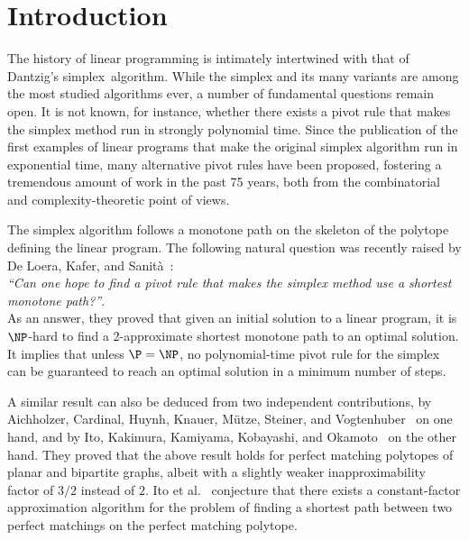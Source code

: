 \documentclass[runningheads]{llncs}
\begin{document}
\section{Introduction}
The history of linear programming is intimately intertwined with that of Dantzig's simplex~algorithm.
While the simplex and its many variants are among the most studied algorithms ever,
a number of fundamental questions remain open. It is not known, for instance, whether there exists
a pivot rule that makes the simplex method run in strongly polynomial time.
Since the publication of the first examples of linear programs that make the original simplex algorithm run in exponential time, many alternative pivot rules have been proposed, fostering a tremendous amount of work in the past 75 years, both from the combinatorial and complexity-theoretic point of views.

The simplex algorithm follows a monotone path on the skeleton of the polytope defining the linear program. The following natural question was recently raised by De Loera, Kafer, and Sanit\`a~\cite{DKS22}:\\

\noindent\textit{``Can one hope to find a pivot rule that makes the simplex method use a shortest monotone path?''}.\\

As an answer, they proved that given an initial solution to a linear program, it is $\NP$-hard to find a 2-approximate shortest monotone path to an optimal solution.
It implies that unless $\P =\NP$, no polynomial-time pivot rule for the simplex can be guaranteed to reach an optimal solution in a minimum number of steps.

A similar result can also be deduced from two independent contributions, by Aichholzer, Cardinal, Huynh, Knauer, M\"utze, Steiner, and Vogtenhuber~\cite{ACHKMS21} on one hand, and by Ito, Kakimura, Kamiyama, Kobayashi, and Okamoto~\cite{IKKKO22} on the other hand. They proved that the above result holds for perfect matching polytopes of planar and bipartite graphs, albeit with a slightly weaker inapproximability factor of $3/2$ instead of $2$. Ito et al.~\cite{IKKKO22} conjecture that there exists a constant-factor approximation algorithm for the problem of finding a shortest path between two perfect matchings on the perfect matching polytope.
\end{document}
